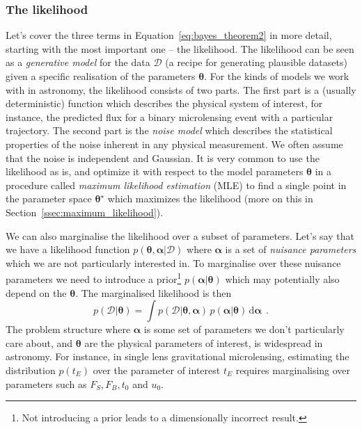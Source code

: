 \documentclass[12pt,dvipsnames]{report}
\newcommand{\ud}{\,\mathrm{d}}
\renewcommand{\vec}[1]{\boldsymbol{\mathbf{#1}}}
\newcommand{\hquad}{~~}
\begin{document}
\subsubsection{The likelihood}
Let's cover the three terms in Equation~\ref{eq:bayes_theorem2} in more detail, starting with the most
important one -- the likelihood. The likelihood can be seen as a \emph{generative model}
for the data $\mathcal{D}$ (a recipe for generating plausible datasets)
given a specific realisation of the parameters $\vec{\theta}$. 
For the kinds of models we work with in astronomy, the likelihood consists
of two parts.
The first part is a (usually deterministic) function which describes the physical
system of interest, for instance, the predicted flux for a binary
microlensing event with a particular trajectory. The second part is the
\emph{noise model} which describes the statistical properties of the noise
inherent in any physical measurement. We often assume that the noise is
independent and Gaussian. It is very common to use the likelihood as is, and
optimize it with respect to the model parameters $\vec{\theta}$ in a procedure
called \emph{maximum likelihood estimation} (MLE) to find a single point in the
parameter space $\vec{\theta}^\star$ which maximizes the likelihood (more on
this in Section~\ref{ssec:maximum_likelihood}).

We can also marginalise the likelihood over a subset of parameters. Let's say that we
have a likelihood function $p(\vec{\theta} ,\vec{\alpha}|\mathcal{D})$ where
$\vec{\alpha}$ is a set of \emph{nuisance parameters} which we are not
particularly interested in. To marginalise over these nuisance parameters we
need to introduce a prior\footnote{Not introducing a prior leads to a
    dimensionally incorrect result.} $p(\vec{\alpha}|\vec{\theta})$ which may
potentially also depend on the $\vec{\theta}$.
The marginalised likelihood is then
\begin{equation}
    p(\mathcal{D} | \vec{\theta})=\int p(\mathcal{D} | \vec{\theta}, \vec{\alpha})\,p(\vec{\alpha} |\vec{\theta}) \ud \vec{\alpha}
    \hquad.
\end{equation}
The problem structure where $\vec{\alpha}$ is some set of parameters
we don't particularly care about, and $\vec{\theta}$ are the physical
parameters of interest, is widespread in astronomy. For instance, in single lens gravitational microlensing, estimating
the distribution $p(t_E)$ over the parameter of interest $t_E$ requires marginalising over
parameters such as $F_S, F_B, t_0$ and $u_0$.
\end{document}
